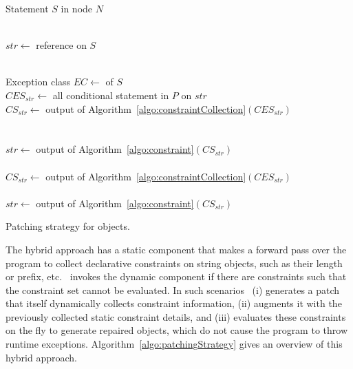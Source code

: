 \begin{algorithm}[t]
\scriptsize
\DontPrintSemicolon
{}
\Begin
{
  {
  Statement $S$ in node $N$\\
   {\\
  	\mytab $str \longleftarrow$  reference on $S$
  	
  	 {\\
  	  \mytab Exception class $EC \longleftarrow$  of
$S$\\
          \mytab $CES_{str} \longleftarrow$ all conditional statement in $P$ on
$str$\\
  	  \mytab $CS_{str} \longleftarrow$ output of
Algorithm~\ref{algo:constraintCollection}$(CES_{str})$\\

  		\mytab {} {\\
			\mytab \mytab {}\\
  			\mytab \mytab $str \longleftarrow$ output of
Algorithm~\ref{algo:constraint}$(CS_{str})$
  		} \mytab {} {\\
  		        \mytab \mytab {}\\
  		        \mytab \mytab $CS_{str} \longleftarrow$ output of
Algorithm~\ref{algo:constraintCollection}$(CES_{str})$\\

                        \mytab \mytab {} {\\
                        \mytab \mytab \mytab $str \longleftarrow$ output of
Algorithm~\ref{algo:constraint}$(CS_{str})$
  		} \mytab \mytab {}\vspace{-4em}
	}
    }
  }
 }
}
\caption{Patching strategy for  objects.}
\label{algo:patchingStrategy}
\end{algorithm}

The hybrid approach has a static component that makes a forward pass over the
program to collect declarative constraints on string objects, such as their
length or prefix, etc. \tool\ invokes the dynamic component if there are constraints
such that the constraint set cannot be evaluated. In
such scenarios \tool\ (i) generates a patch that itself dynamically collects
constraint information, (ii) augments it with the previously collected static
constraint details, and (iii) evaluates these constraints on the fly to generate
repaired  objects, which do not cause the program to throw runtime
exceptions. Algorithm~\ref{algo:patchingStrategy} gives an overview of this
hybrid approach.


